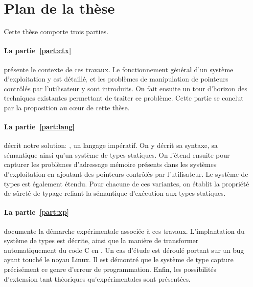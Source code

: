 
\section{Plan de la thèse}

Cette thèse comporte trois parties.

\paragraph{La partie~\ref{part:ctx}} présente le contexte de ces travaux. Le
fonctionnement général d'un système d'exploitation y est détaillé, et les
problèmes de manipulation de pointeurs contrôlés par l'utilisateur y sont
introduits. On fait ensuite un tour d'horizon des techniques existantes
permettant de traiter ce problème. Cette partie se conclut par la proposition au
cœur de cette thèse.

\paragraph{La partie~\ref{part:lang}} décrit notre solution: \langname{}, un
langage impératif. On y décrit sa syntaxe, sa sémantique ainsi qu'un système de
types statiques. On l'étend ensuite pour capturer les problèmes d'adressage
mémoire présents dans les systèmes d'exploitation en ajoutant des pointeurs
contrôlés par l'utilisateur. Le système de types est également étendu. Pour
chacune de ces variantes, on établit la propriété de sûreté de typage reliant la
sémantique d'exécution aux types statiques.

\paragraph{La partie~\ref{part:xp}} documente la démarche expérimentale associée
à ces travaux. L'implantation du système de types est décrite, ainsi que la
manière de transformer automatiquement du code C en \langname{}. Un cas d'étude
est déroulé portant sur un bug ayant touché le noyau Linux. Il est démontré que
le système de type capture précisément ce genre d'erreur de programmation.
Enfin, les possibilités d'extension tant théoriques qu'expérimentales sont
présentées.

